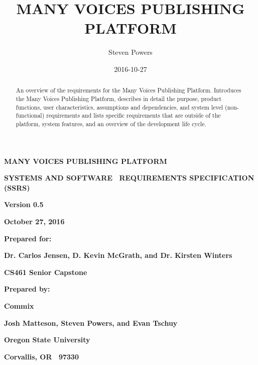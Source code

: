 \documentclass[letterpaper, 10pt, draftclsnofoot, compsoc, onecolumn]{IEEEtran}
\title{MANY VOICES PUBLISHING PLATFORM}
\author{Steven Powers}
\date{2016-10-27}
\begin{document}
\clearpage\setcounter{page}{1}%
\thispagestyle{FirstPage}


\bigskip
\bigskip
\clearpage
{\centering\bfseries\color{black}\huge
MANY VOICES PUBLISHING PLATFORM
\par}
\bigskip
\bigskip
{\centering\bfseries\color{black}\Large
SYSTEMS AND SOFTWARE \ REQUIREMENTS SPECIFICATION (SSRS)
\par}
\bigskip
\bigskip
\bigskip
\bigskip
\bigskip
{\centering\bfseries\color{black}Version 0.5\par}
{\centering\bfseries\color{black}October 27, 2016\par}
\bigskip
\bigskip
{\centering\bfseries\color{black}Prepared for:\par}
{\centering\bfseries\color{black}Dr. Carlos Jensen, D. Kevin McGrath, and Dr. Kirsten Winters\par}
{\centering\bfseries\color{black}CS461 Senior Capstone\par}
\bigskip
\bigskip
{\centering\bfseries\color{black}Prepared by:\par}
{\centering\bfseries\color{black}Commix\par}
{\centering\bfseries\color{black}Josh Matteson, Steven Powers, and Evan Tschuy\par}
{\centering\bfseries\color{black}Oregon State University\par}
{\centering\bfseries\color{black}Corvallis, OR \ 97330\par}
\bigskip

\begin{abstract}
\noindent An overview of the requirements for the Many Voices Publishing Platform. 
Introduces the Many Voices Publishing Platform, describes in detail the purpose, 
product functions, user characteristics, assumptions and dependencies, 
and system level (non-functional) requirements and lists specific requirements 
that are outside of the platform, system features, and an overview of the development life cycle.
\end{abstract}
\end{document}
